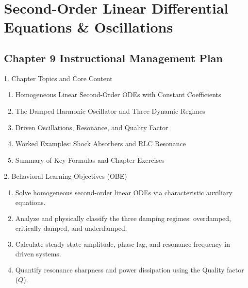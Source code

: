 \chapter{Second-Order Linear Differential Equations \& Oscillations}

\section*{Chapter 9 Instructional Management Plan}

\begin{planbox}[colframe=rbruNavy, colbacktitle=rbruNavy]{1. Chapter Topics and Core Content}
\begin{enumerate}[topsep=2pt, itemsep=1pt, partopsep=0pt, parsep=0pt, leftmargin=1.5em]
    \item Homogeneous Linear Second-Order ODEs with Constant Coefficients
    \item The Damped Harmonic Oscillator and Three Dynamic Regimes
    \item Driven Oscillations, Resonance, and Quality Factor
    \item Worked Examples: Shock Absorbers and RLC Resonance
    \item Summary of Key Formulas and Chapter Exercises
\end{enumerate}
\end{planbox}

\begin{planbox}[colframe=rbruGreen, colbacktitle=rbruGreen]{2. Behavioral Learning Objectives (OBE)}
\begin{enumerate}[topsep=2pt, itemsep=1pt, partopsep=0pt, parsep=0pt, leftmargin=1.5em]
    \item Solve homogeneous second-order linear ODEs via characteristic auxiliary equations.
    \item Analyze and physically classify the three damping regimes: overdamped, critically damped, and underdamped.
    \item Calculate steady-state amplitude, phase lag, and resonance frequency in driven systems.
    \item Quantify resonance sharpness and power dissipation using the Quality factor ($Q$).
\end{enumerate}
\end{planbox}

